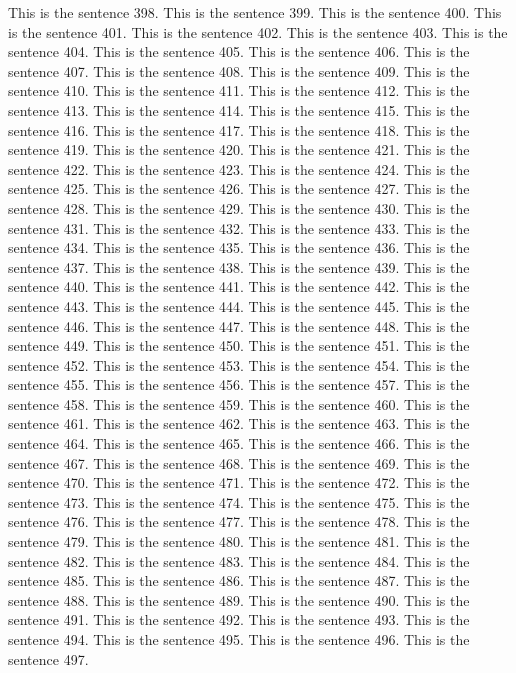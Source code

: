 \documentclass{article}
\begin{document}
This is the sentence 398.
This is the sentence 399.
This is the sentence 400.
This is the sentence 401.
This is the sentence 402.
This is the sentence 403.
This is the sentence 404.
This is the sentence 405.
This is the sentence 406.
This is the sentence 407.
This is the sentence 408.
This is the sentence 409.
This is the sentence 410.
This is the sentence 411.
This is the sentence 412.
This is the sentence 413.
This is the sentence 414.
This is the sentence 415.
This is the sentence 416.
This is the sentence 417.
This is the sentence 418.
This is the sentence 419.
This is the sentence 420.
This is the sentence 421.
This is the sentence 422.
This is the sentence 423.
This is the sentence 424.
This is the sentence 425.
This is the sentence 426.
This is the sentence 427.
This is the sentence 428.
This is the sentence 429.
This is the sentence 430.
This is the sentence 431.
This is the sentence 432.
This is the sentence 433.
This is the sentence 434.
This is the sentence 435.
This is the sentence 436.
This is the sentence 437.
This is the sentence 438.
This is the sentence 439.
This is the sentence 440.
This is the sentence 441.
This is the sentence 442.
This is the sentence 443.
This is the sentence 444.
This is the sentence 445.
This is the sentence 446.
This is the sentence 447.
This is the sentence 448.
This is the sentence 449.
This is the sentence 450.
This is the sentence 451.
This is the sentence 452.
This is the sentence 453.
This is the sentence 454.
This is the sentence 455.
This is the sentence 456.
This is the sentence 457.
This is the sentence 458.
This is the sentence 459.
This is the sentence 460.
This is the sentence 461.
This is the sentence 462.
This is the sentence 463.
This is the sentence 464.
This is the sentence 465.
This is the sentence 466.
This is the sentence 467.
This is the sentence 468.
This is the sentence 469.
This is the sentence 470.
This is the sentence 471.
This is the sentence 472.
This is the sentence 473.
This is the sentence 474.
This is the sentence 475.
This is the sentence 476.
This is the sentence 477.
This is the sentence 478.
This is the sentence 479.
This is the sentence 480.
This is the sentence 481.
This is the sentence 482.
This is the sentence 483.
This is the sentence 484.
This is the sentence 485.
This is the sentence 486.
This is the sentence 487.
This is the sentence 488.
This is the sentence 489.
This is the sentence 490.
This is the sentence 491.
This is the sentence 492.
This is the sentence 493.
This is the sentence 494.
This is the sentence 495.
This is the sentence 496.
This is the sentence 497.
\end{document}
